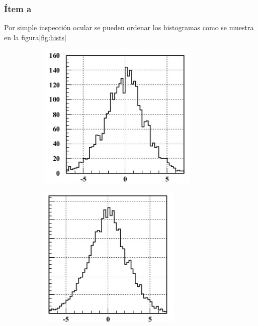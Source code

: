 \subsubsection*{Ítem a}
Por simple inspección ocular se pueden ordenar los histogramas como se muestra en la figura\ref{fig:hists}
\begin{figure}
\centering
\begin{subfigure}[b]{0.3\textwidth}
\includegraphics[width=0.84\textwidth]{hist3.jpg}
\end{subfigure}
\begin{subfigure}[b]{0.3\textwidth}
\includegraphics[width=0.75\textwidth]{hist2.jpg}
\end{subfigure}

\end{figure}
